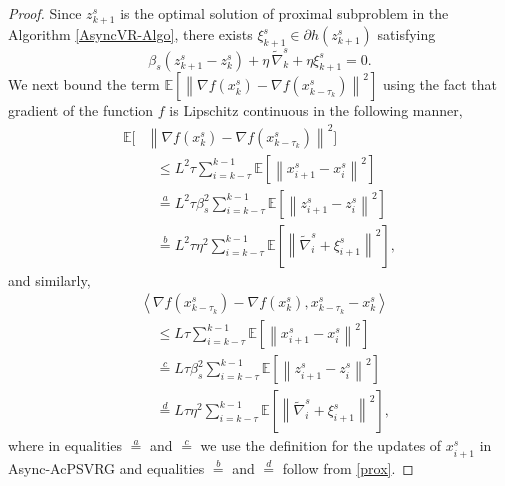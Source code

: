 \documentclass[conference]{IEEEtran}
\newcommand*{\E}{\mathbb{E}}
\newcommand*{\VRG}{\,\widetilde{\nabla}_k^s}
\newcommand{\norm}[1]{\left\lVert#1\right\rVert}
\newcommand{\Iprod}[2]{\left\langle #1,#2\right\rangle}
\theoremstyle{definition}
\theoremstyle{remark}
\begin{document}
\begin{proof}
Since $z_{k+1}^s$ is the optimal solution of proximal subproblem in the Algorithm \ref{AsyncVR-Algo}, there exists ${\xi}_{k+1}^s\in\partial h(z_{k+1}^s)$ satisfying
\begin{equation}\label{prox}
{\beta_s}(z_{k+1}^s - z_{k}^s) + \eta\VRG + \eta{\xi}_{k+1}^s = 0.
\end{equation}
We next bound the term $\E[\norm{\nabla f(x_{k}^s)-\nabla f(x_{k-\tau_k}^s)}^2]$ using the fact that gradient of the function $f$ is Lipschitz continuous in the following manner,
\begin{equation}\label{Eq5-Lemma1}
\begin{split}
\E[&\norm{\nabla f(x_{k}^s)-\nabla f(x_{k-\tau_k}^s)}^2]\\
&~~~\leq L^2\tau \sum_{i = k-\tau}^{k-1}\E[\norm{x_{i+1}^s-x_{i}^s}^2]\\
&~~~\stackrel{a}{=} L^2\tau\beta_s^2\sum_{i = k-\tau}^{k-1}\E[\norm{z_{i+1}^s-z_{i}^s}^2] \\
&~~~\stackrel{b}{=} { L^2\tau\eta^2\sum_{i = k-\tau}^{k-1}\E[\norm{\widetilde{\nabla}_{i}^s+{\xi}_{i+1}^s}^2]},
\end{split}
\end{equation}
and similarly,
\begin{equation}\label{Eq5p-Lemma1}
\begin{split}
&\Iprod{\nabla f(x_{k-\tau_k}^s)-\nabla f(x_{k}^s)}{x_{k-\tau_k}^s-{x}^{s}_{k}}\\
&~~~~~\leq L\tau \sum_{i = k-\tau}^{k-1}\E[\norm{x_{i+1}^s-x_{i}^s}^2]\\
&~~~~~\stackrel{c}{=} L\tau\beta_s^2\sum_{i = k-\tau}^{k-1}\E[\norm{z_{i+1}^s-z_{i}^s}^2] \\
&~~~~~\stackrel{d}{=}  L\tau\eta^2\sum_{i = k-\tau}^{k-1}\E[\norm{\widetilde{\nabla}_{i}^s+{\xi}_{i+1}^s}^2],
\end{split}
\end{equation}
where in equalities $\stackrel{a}{=}$ and  $\stackrel{c}{=}$ we use the definition for the updates of $x_{i+1}^s$ in Async-AcPSVRG and equalities $\stackrel{b}{=}$ and $\stackrel{d}{=}$ follow from \eqref{prox}.


\end{proof}
\end{document}
